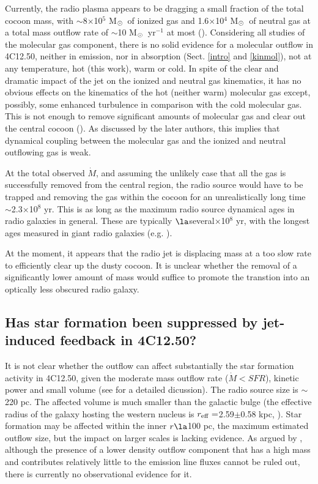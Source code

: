 \documentclass{aa}
\newcommand{\msun}{M$_{\rm \odot}$~}
\begin{document}
Currently, the radio plasma  appears to be dragging a small fraction of the total cocoon mass,  with $\sim$8$\times$10$^5$ \msun of ionized gas and 1.6$\times$10$^4$ \msun  of  neutral gas at a total mass outflow rate of $\sim$10 \msun yr$^{-1}$ at most (\citealt{Holt2011,Morganti2013,Rose2018}).   
Considering all studies of the molecular gas component, there is no solid evidence for a  molecular outflow in 4C12.50, neither in emission, nor in absorption (Sect. \ref{intro} and \ref{kinmol}), not at any temperature, hot (this work), warm or cold.
In spite of the clear and dramatic impact of the jet  on  the ionized and neutral gas kinematics, it  has no obvious effects on the kinematics of the hot (neither warm) molecular gas except, possibly, some enhanced turbulence in comparison with the cold molecular gas. This is not enough to remove significant amounts of molecular gas and clear out the central cocoon   (\citealt{Guillard2012}). As discussed by the later authors,  this implies that dynamical coupling between the
molecular gas and the  ionized and neutral outflowing gas is weak. 


At the total observed $\dot{M}$, and assuming the unlikely case that all the gas is successfully removed from the central region, the radio source would have to be trapped and removing the gas within the cocoon for an unrealistically long time $\sim$2.3$\times$10$^8$ yr. This is as long as the maximum  radio source dynamical ages in radio galaxies in general. These are typically $\la$several$\times$10$^8$ yr, with the longest ages measured in giant radio galaxies (e.g. \citealt{Machalski2007,Machalski2009}).

At the moment, it appears that the radio jet is displacing mass at a too slow rate to efficiently clear up the dusty cocoon. It is unclear whether the removal of a significantly lower amount of mass would suffice to promote the transtion into an optically less obscured radio galaxy. 


\subsection{Has star formation been suppressed by jet-induced feedback in 4C12.50?}


It is not clear whether the outflow can affect substantially the star formation activity in 4C12.50, given the moderate mass outflow rate ($\dot{M}<  SFR$), kinetic power  and small volume (see \citealt{Rose2018} for a detailed dicussion).  The radio source size is   $\sim$220 pc.  The affected volume is much smaller than the galactic bulge (the effective radius of the galaxy hosting the western nucleus is $r_{\rm eff}=$2.59$\pm$0.58 kpc, \citealt{Dasyra2006}).  Star formation   may be affected within the inner $r\la$100 pc,  the maximum estimated outflow size, but the  impact on larger scales is lacking evidence.     As argued by \cite{Rose2018}, although the presence of a lower density outflow component that has a high mass and contributes relatively little to the emission line fluxes cannot be ruled out, there is currently no  observational evidence for it.
\end{document}
